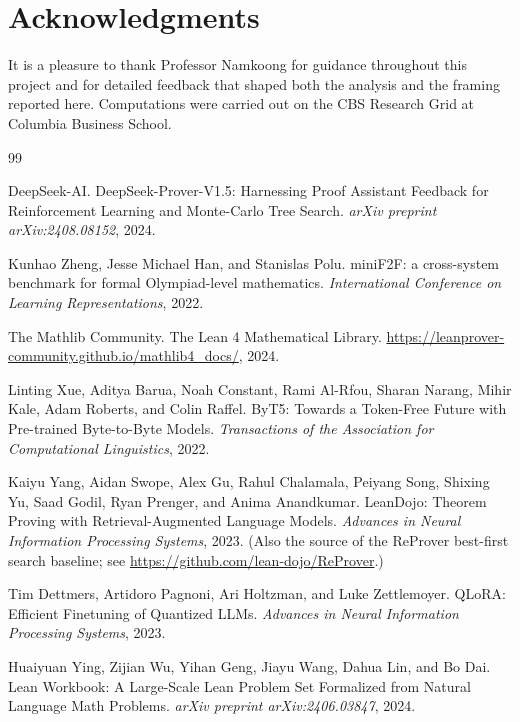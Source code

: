 \documentclass[openany, amssymb, psamsfonts]{amsart}
\theoremstyle{definition}
\numberwithin{equation}{section}
\begin{document}
\section*{Acknowledgments}

It is a pleasure to thank Professor Namkoong for guidance throughout this
project and for detailed feedback that shaped both the analysis and the
framing reported here.
Computations were carried out on the CBS Research Grid at Columbia Business
School.

\clearpage
\begin{thebibliography}{99}

DeepSeek-AI.
DeepSeek-Prover-V1.5: Harnessing Proof Assistant Feedback for Reinforcement
Learning and Monte-Carlo Tree Search.
\textit{arXiv preprint arXiv:2408.08152}, 2024.

Kunhao Zheng, Jesse Michael Han, and Stanislas Polu.
miniF2F: a cross-system benchmark for formal Olympiad-level mathematics.
\textit{International Conference on Learning Representations}, 2022.

The Mathlib Community.
The Lean 4 Mathematical Library.
\url{https://leanprover-community.github.io/mathlib4_docs/}, 2024.

Linting Xue, Aditya Barua, Noah Constant, Rami Al-Rfou, Sharan Narang,
Mihir Kale, Adam Roberts, and Colin Raffel.
ByT5: Towards a Token-Free Future with Pre-trained Byte-to-Byte Models.
\textit{Transactions of the Association for Computational Linguistics}, 2022.

Kaiyu Yang, Aidan Swope, Alex Gu, Rahul Chalamala, Peiyang Song, Shixing Yu,
Saad Godil, Ryan Prenger, and Anima Anandkumar.
LeanDojo: Theorem Proving with Retrieval-Augmented Language Models.
\textit{Advances in Neural Information Processing Systems}, 2023.
(Also the source of the ReProver best-first search baseline; see
\url{https://github.com/lean-dojo/ReProver}.)

Tim Dettmers, Artidoro Pagnoni, Ari Holtzman, and Luke Zettlemoyer.
QLoRA: Efficient Finetuning of Quantized LLMs.
\textit{Advances in Neural Information Processing Systems}, 2023.

Huaiyuan Ying, Zijian Wu, Yihan Geng, Jiayu Wang, Dahua Lin, and Bo Dai.
Lean Workbook: A Large-Scale Lean Problem Set Formalized from Natural Language
Math Problems.
\textit{arXiv preprint arXiv:2406.03847}, 2024.


\end{thebibliography}
\end{document}
